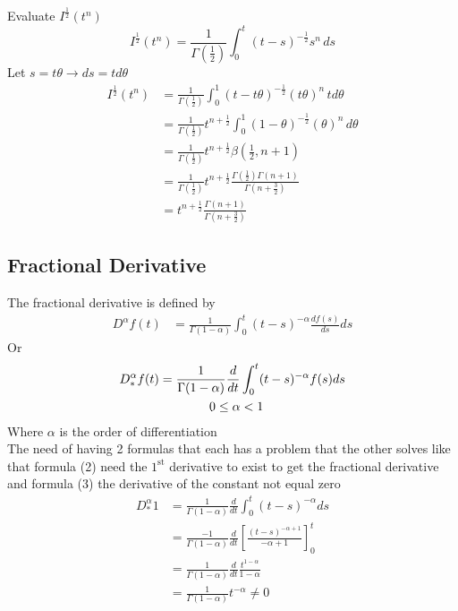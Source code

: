 \begin{example}
    Evaluate $I^{ \frac{1}{2}}(t^{n})$\\
    \[
        I^{ \frac{1}{2}}(t^{n}) = \frac{1}{\Gamma{(\frac{1}{2})}} \int_0^t (t-s)^{ -\frac{1}{2}} s^n \, ds
    \]
    Let $s=t\theta \rightarrow ds=t d\theta$
    \begin{align*}
        I^{ \frac{1}{2}}(t^{n}) & = \frac{1}{\Gamma{(\frac{1}{2})}} \int_0^1 (t-t\theta)^{-\frac{1}{2}} (t\theta)^n \, td\theta                            \\
                                & = \frac{1}{\Gamma{(\frac{1}{2})}} t^{n+\frac{1}{2}} \int_0^1 (1-\theta)^{-\frac{1}{2}} (\theta)^n \, d\theta             \\
                                & = \frac{1}{\Gamma{(\frac{1}{2})}} t^{n+\frac{1}{2}} \beta{(\frac{1}{2},n+1)}                                             \\
                                & = \frac{1}{\Gamma{(\frac{1}{2})}} t^{n+\frac{1}{2}}\frac{\Gamma{(\frac{1}{2})\Gamma{(n+1)} } }{\Gamma{(n+\frac{3}{2})} } \\
                                & =  t^{n+\frac{1}{2}}\frac{\Gamma{(n+1)} } {\Gamma{(n+\frac{3}{2})} }
    \end{align*}
\end{example}

\subsection{Fractional Derivative}
The fractional derivative is defined by
\begin{align}
    D^{\alpha}f(t) & = \frac{1}{\Gamma(1-\alpha)}\int_{0}^{t}(t-s)^{-\alpha}\frac{d f(s)}{ds}ds
\end{align}
Or
\begin{align}
    D_*^{\alpha}f(t) & = \frac{1}{\Gamma(1-\alpha)}\frac{d}{dt}\int_{0}^{t}(t-s)^{-\alpha}f(s)ds
    \\\notag
                     & \quad\quad\quad\quad0\leq \alpha < 1
\end{align}
Where $\alpha$ is the order of differentiation
\\
The need of having 2 formulas that each has a problem that the other solves
like that formula (2) need the $1^{\text{st}}$ derivative to exist to get the fractional derivative
and formula (3) the derivative of the constant not equal zero
\begin{align*}
    D_*^{\alpha} 1 & = \frac{1}{\Gamma(1-\alpha)}\frac{d}{dt}\int_{0}^{t}(t-s)^{-\alpha}ds
    \\
                   & = \frac{-1}{\Gamma(1-\alpha)}\frac{d}{dt} \left[\frac{(t-s)^{-\alpha+1}}{-\alpha+1}\right]_{0}^{t}
    \\
                   & = \frac{1}{\Gamma(1-\alpha)} \frac{d}{dt} \frac{t^{1-\alpha}}{1-\alpha}
    \\
                   & = \frac{1}{\Gamma(1-\alpha)} t^{-\alpha} \neq 0
\end{align*}

